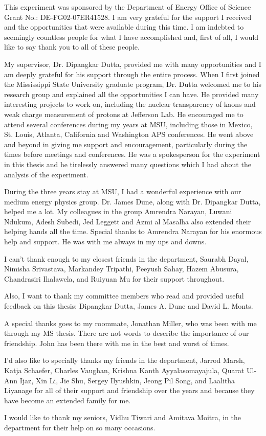 %
This experiment was sponsored by the Department of Energy Office of Science Grant No.: DE-FG02-07ER41528. I am very grateful for the support I received and the opportunities that were available during this time. I am indebted to seemingly countless people for what I have accomplished and, first of all, I would like to say thank you to all of these people.

My supervisor, Dr. Dipangkar Dutta, provided me with many opportunities and I am deeply grateful for his support through the entire process. When I first joined the Mississippi State University graduate program, Dr. Dutta welcomed me to his research group and explained all the opportunities I can have. He provided many interesting projects to work on, including the nuclear transparency of kaons and weak charge measurement of protons at Jefferson Lab. He encouraged me to attend several conferences during my years at MSU, including those in Mexico, St. Louis, Atlanta, California and Washington APS conferences. He went above and beyond in giving me support and encouragement, particularly during the times before meetings and conferences. He was a spokesperson for the experiment in this thesis and he tirelessly answered many questions which I had about the analysis of the experiment.

During the three years stay at MSU, I had a wonderful experience with our medium energy physics group. Dr. James Dune, along with Dr. Dipangkar Dutta, helped me a lot. My colleagues in the group Amrendra Narayan, Luwani Ndukum, Adesh Subedi, Jed Leggett and Azmi al Masalha also extended their helping hands all the time. Special thanks to Amrendra Narayan for his enormous help and support. He was with me always in my ups and downs.

I can't thank enough to my closest friends in the department, Saurabh Dayal, Nimisha Srivastava, Markandey Tripathi, Peeyush Sahay, Hazem Abusura, Chandrasiri Ihalawela, and Ruiyuan Mu for their support throughout.

Also, I want to thank my committee members who read and provided useful feedback on this thesis: Dipangkar Dutta, James A. Dune and David L. Monts.

A special thanks goes to my roommate, Jonathan Miller, who was been with me through my MS thesis. There are not words to describe the importance of our friendship. John has been there with me in the best and worst of times.

I'd also like to specially thanks my friends in the department, Jarrod Marsh, Katja Schaefer, Charles Vaughan, Krishna Kanth Ayyalasomayajula, Quarat Ul-Ann Ijaz, Xin Li, Jie Shu, Sergey Ilyushkin, Jeong Pil Song, and Laalitha Liyanage for all of their support and friendship over the years and because they have become an extended family for me.

I would like to thank my seniors, Vidhu Tiwari and Amitava Moitra, in the department for their help on so many occasions.